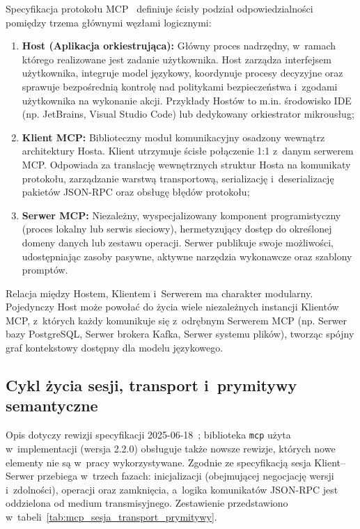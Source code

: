 Specyfikacja protokołu MCP~\cite{mcp_spec} definiuje ścisły podział odpowiedzialności pomiędzy trzema głównymi węzłami logicznymi:
\begin{enumerate}
    \item \textbf{Host (Aplikacja orkiestrująca):} Główny proces nadrzędny, w~ramach którego realizowane jest zadanie użytkownika. Host zarządza interfejsem użytkownika, integruje model językowy, koordynuje procesy decyzyjne oraz sprawuje bezpośrednią kontrolę nad politykami bezpieczeństwa i~zgodami użytkownika na wykonanie akcji. Przykłady Hostów to m.in. środowisko IDE (np. JetBrains, Visual Studio Code) lub dedykowany orkiestrator mikrousług;
    \item \textbf{Klient MCP:} Biblioteczny moduł komunikacyjny osadzony wewnątrz architektury Hosta. Klient utrzymuje ścisłe połączenie 1:1 z~danym serwerem MCP. Odpowiada za translację wewnętrznych struktur Hosta na komunikaty protokołu, zarządzanie warstwą transportową, serializację i~deserializację pakietów JSON-RPC oraz obsługę błędów protokołu;
    \item \textbf{Serwer MCP:} Niezależny, wyspecjalizowany komponent programistyczny (proces lokalny lub serwis sieciowy), hermetyzujący dostęp do określonej domeny danych lub zestawu operacji. Serwer publikuje swoje możliwości, udostępniając zasoby pasywne, aktywne narzędzia wykonawcze oraz szablony promptów.
\end{enumerate}

Relacja między Hostem, Klientem i~Serwerem ma charakter modularny. Pojedynczy Host może powołać do życia wiele niezależnych instancji Klientów MCP, z~których każdy komunikuje się z~odrębnym Serwerem MCP (np. Serwer bazy PostgreSQL, Serwer brokera Kafka, Serwer systemu plików), tworząc spójny graf kontekstowy dostępny dla modelu językowego.

\subsection{Cykl życia sesji, transport i~prymitywy semantyczne}
\label{subsec:teoria_cykl_zycia_mcp}

Opis dotyczy rewizji specyfikacji 2025-06-18~\cite{mcp_spec_20250618}; biblioteka \texttt{mcp} użyta w~implementacji (wersja 2.2.0) obsługuje także nowsze rewizje, których nowe elementy nie są w~pracy wykorzystywane. Zgodnie ze specyfikacją sesja Klient--Serwer przebiega w~trzech fazach: inicjalizacji (obejmującej negocjację wersji i~zdolności), operacji oraz zamknięcia, a~logika komunikatów JSON-RPC jest oddzielona od medium transmisyjnego. Zestawienie przedstawiono w~tabeli~\ref{tab:mcp_sesja_transport_prymitywy}.

